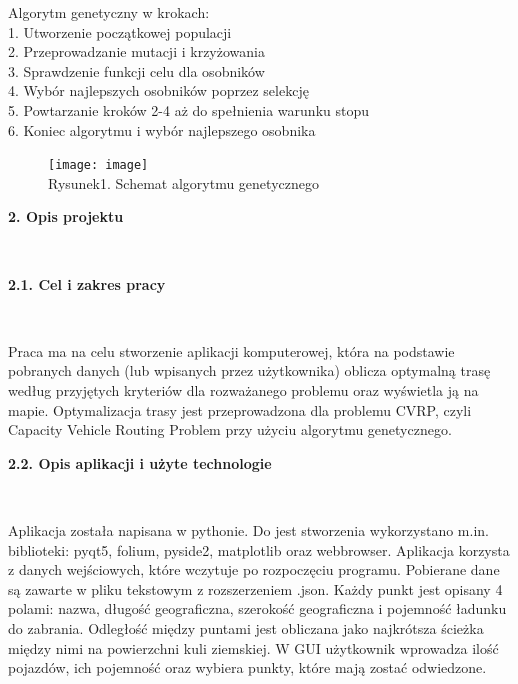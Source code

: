 \documentclass[a4paper, twoside, 12pt, justified]{article}
\begin{document}
	Algorytm genetyczny w krokach:\\
	1. Utworzenie początkowej populacji\\
	2. Przeprowadzanie mutacji i krzyżowania\\
	3. Sprawdzenie funkcji celu dla osobników\\
	4. Wybór najlepszych osobników poprzez selekcję\\
	5. Powtarzanie kroków 2-4 aż do spełnienia warunku stopu\\
	6. Koniec algorytmu i wybór najlepszego osobnika
	
	\vspace{10mm}
	
	
	\begin{figure}[h]
	\texttt{[image: image]}
	\centering
	\\
	{Rysunek1. Schemat algorytmu genetycznego} 
	\end{figure}
	
	
	
	\newpage
	\begin{large}\textbf{2. Opis projektu}\end{large}\\
	\vspace{5mm} %
	
	\begin{large}\textbf{2.1. Cel i zakres pracy}\end{large}\\
	\vspace{10mm} %
	
	 Praca ma na celu stworzenie
	 aplikacji komputerowej, która na podstawie pobranych danych (lub wpisanych przez użytkownika) oblicza optymalną trasę według przyjętych kryteriów dla rozważanego problemu oraz wyświetla ją na mapie. Optymalizacja trasy jest przeprowadzona dla problemu CVRP, czyli Capacity Vehicle Routing Problem przy użyciu algorytmu genetycznego. 
	 \vspace{10mm}
	 
	 \begin{large}\textbf{2.2. Opis aplikacji i użyte technologie}\end{large}\\
	 \vspace{10mm} %
	 
	 Aplikacja została napisana w pythonie. Do jest stworzenia wykorzystano m.in. biblioteki: pyqt5, folium, pyside2, matplotlib oraz webbrowser. Aplikacja korzysta z danych wejściowych, które wczytuje po rozpoczęciu programu. Pobierane dane są zawarte w pliku tekstowym z rozszerzeniem .json. Każdy punkt jest opisany 4 polami: nazwa, długość geograficzna, szerokość geograficzna i pojemność ładunku do zabrania. Odległość między puntami jest obliczana jako najkrótsza ścieżka między nimi na powierzchni kuli ziemskiej. W GUI użytkownik wprowadza ilość pojazdów, ich pojemność oraz wybiera punkty, które mają zostać odwiedzone.
	
\end{document}
